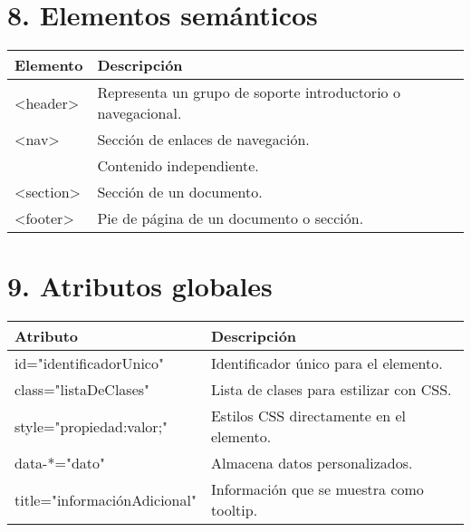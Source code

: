 \documentclass{article}
\begin{document}
\section*{8. Elementos semánticos}
\begin{tabular}{>{\ttfamily}l p{10cm}}
\textnormal{Elemento} & Descripción \\
\hline
<header> & Representa un grupo de soporte introductorio o navegacional. \\
<nav> & Sección de enlaces de navegación. \\
<article> & Contenido independiente. \\
<section> & Sección de un documento. \\
<footer> & Pie de página de un documento o sección. \\
\end{tabular}

\section*{9. Atributos globales}
\begin{tabular}{>{\ttfamily}l p{10cm}}
\textnormal{Atributo} & Descripción \\
\hline
id="identificadorUnico" & Identificador único para el elemento. \\
class="listaDeClases" & Lista de clases para estilizar con CSS. \\
style="propiedad:valor;" & Estilos CSS directamente en el elemento. \\
data-*="dato" & Almacena datos personalizados. \\
title="informaciónAdicional" & Información que se muestra como tooltip. \\
\end{tabular}
\end{document}
